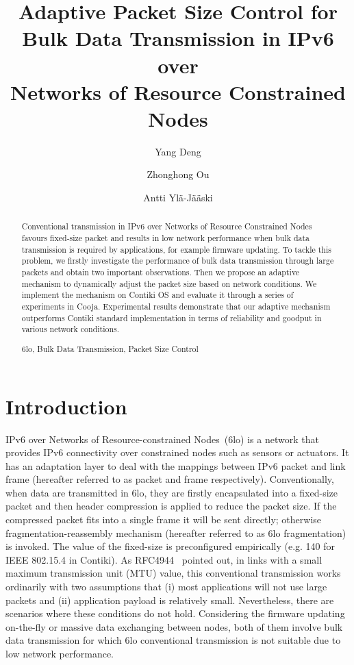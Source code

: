 \documentclass[runningheads,a4paper]{llncs}
\newcommand{\keywords}[1]{\par\addvspace\baselineskip
\noindent\keywordname\enspace\ignorespaces#1}
\begin{document}
\mainmatter

\title{Adaptive Packet Size Control for \\Bulk Data Transmission in IPv6 over\\Networks of Resource Constrained Nodes}

\author{Yang Deng\and Zhonghong Ou\and Antti Yl\"a-J\"a\"aski}


\maketitle

\begin{abstract}
Conventional transmission in IPv6 over Networks of Resource Constrained Nodes favours fixed-size packet and results in low network performance when bulk data transmission is required by applications, for example firmware updating. To tackle this problem, we firstly investigate the performance of bulk data transmission through large packets and obtain two important observations. Then we propose an adaptive mechanism to dynamically adjust the packet size based on network conditions. We implement the mechanism on Contiki OS and evaluate it through a series of experiments in Cooja. Experimental results demonstrate that our adaptive mechanism outperforms Contiki standard implementation in terms of reliability and goodput in various network conditions.

\keywords{6lo, Bulk Data Transmission, Packet Size Control}
\end{abstract}

\section{Introduction}
IPv6 over Networks of Resource-constrained Nodes~(6lo) is a network that provides IPv6 connectivity over constrained nodes such as sensors or actuators. It has an adaptation layer to deal with the mappings between IPv6 packet and link frame (hereafter referred to as packet and frame respectively). Conventionally, when data are transmitted in 6lo, they are firstly encapsulated into a fixed-size packet and then header compression is applied to reduce the packet size. If the compressed packet fits into a single frame it will be sent directly; otherwise fragmentation-reassembly mechanism (hereafter referred to as 6lo fragmentation) is invoked. The value of the fixed-size is preconfigured empirically (e.g. 140 for IEEE 802.15.4 in Contiki). As RFC4944~\cite{rfc4944} pointed out, in links with a small maximum transmission unit (MTU) value, this conventional transmission works ordinarily with two assumptions that (i) most applications will not use large packets and (ii) application payload is relatively small. Nevertheless, there are scenarios where these conditions do not hold. Considering the firmware updating on-the-fly or massive data exchanging between nodes, both of them involve bulk data transmission for which 6lo conventional transmission is not suitable due to low network performance.
\end{document}
